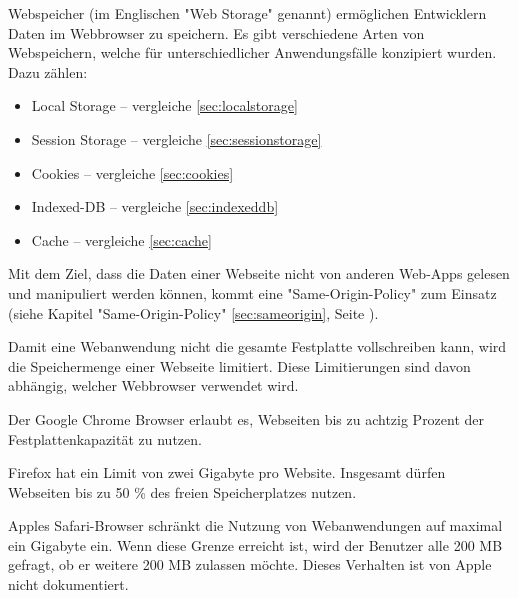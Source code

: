\label{sec:webstorage}


Webspeicher (im Englischen "Web Storage" genannt) ermöglichen Entwicklern %
Daten im Webbrowser zu speichern.
Es gibt verschiedene Arten von Webspeichern, welche für unterschiedlicher Anwendungsfälle konzipiert wurden. Dazu zählen:

\begin{itemize}
    \item Local Storage -- vergleiche \ref{sec:localstorage}
    \item Session Storage -- vergleiche \ref{sec:sessionstorage}
    \item Cookies -- vergleiche \ref{sec:cookies}
    \item Indexed-DB -- vergleiche \ref{sec:indexeddb}
    \item Cache -- vergleiche \ref{sec:cache}
\end{itemize}

Mit dem Ziel, dass die Daten einer Webseite nicht von anderen Web-Apps gelesen und manipuliert werden können, kommt eine  "Same-Origin-Policy" zum Einsatz (siehe Kapitel "Same-Origin-Policy" \ref{sec:sameorigin}, Seite \pageref{sec:sameorigin}).


Damit eine Webanwendung nicht die gesamte Festplatte vollschreiben kann, wird die Speichermenge einer Webseite limitiert. 
Diese Limitierungen sind davon abhängig, welcher Webbrowser verwendet wird. \cite{WebDevStorage}

Der Google Chrome Browser erlaubt es, Webseiten bis zu achtzig Prozent der Fest\-platten\-kapazität zu nutzen. 

Firefox hat ein Limit von zwei Gigabyte pro Website. Insgesamt dürfen Webseiten bis zu 50 \% des freien Speicherplatzes nutzen. 

Apples Safari-Browser schränkt die Nutzung von Webanwendungen auf maximal ein Gigabyte ein. 
Wenn diese Grenze erreicht ist, wird der Benutzer alle 200 MB gefragt, ob er weitere 200 MB zulassen möchte. 
Dieses Verhalten ist von Apple nicht dokumentiert. 

